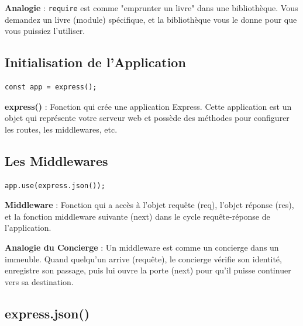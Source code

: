 \begin{analogybox}
    \textbf{Analogie} : \texttt{require} est comme "emprunter un livre" dans une bibliothèque. Vous demandez un livre (module) spécifique, et la bibliothèque vous le donne pour que vous puissiez l'utiliser.
\end{analogybox}

\subsection{Initialisation de l'Application}

\begin{lstlisting}[style=javascript]
const app = express();
\end{lstlisting}

\begin{definitionbox}
    \textbf{express()} : Fonction qui crée une application Express. Cette application est un objet qui représente votre serveur web et possède des méthodes pour configurer les routes, les middlewares, etc.
\end{definitionbox}

\subsection{Les Middlewares}

\begin{lstlisting}[style=javascript]
app.use(express.json());
\end{lstlisting}

\begin{definitionbox}
    \textbf{Middleware} : Fonction qui a accès à l'objet requête (req), l'objet réponse (res), et la fonction middleware suivante (next) dans le cycle requête-réponse de l'application.
\end{definitionbox}

\begin{analogybox}
    \textbf{Analogie du Concierge} : Un middleware est comme un concierge dans un immeuble. Quand quelqu'un arrive (requête), le concierge vérifie son identité, enregistre son passage, puis lui ouvre la porte (next) pour qu'il puisse continuer vers sa destination.
\end{analogybox}

\subsection{express.json()}

